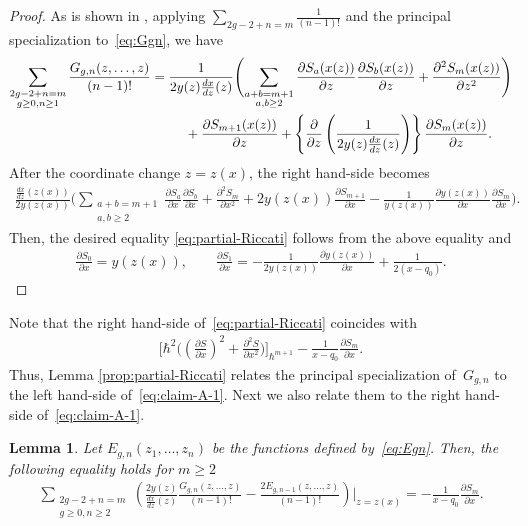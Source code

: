 \documentclass[pdftex]{sigma}
\newtheorem{lem}[thm]{Lemma}
\theoremstyle{definition}
\numberwithin{equation}{section}
\def\p{\partial}
\begin{document}
\begin{proof}
As is shown in \cite[Theorem 6.5]{DM14},
applying $\sum\limits_{2g-2+n=m} \frac{1}{(n-1)!}$
and the principal specia\-li\-zation to~\eqref{eq:Ggn}, we have
\begin{gather*}
\sum_{\substack{2g-2+n=m \\ g\ge0, n\ge 1}}
\frac{G_{g,n}(z,\dots,z)}{(n-1)!} = \frac{1}{2y(z)\frac{dx}{dz}(z)}
\Biggl( \sum_{\substack{a+b=m+1 \\ a,b \ge 2}}
\frac{\p S_{a}(x(z))}{\p z} \frac{\p S_{b}(x(z))}{\p z} +
\frac{\p^{2}S_{m}(x(z))}{\p z^{2}} \Biggr)
\\
\hphantom{\sum_{\substack{2g-2+n=m \\ g\ge0, n\ge 1}}
\frac{G_{g,n}(z,\dots,z)}{(n-1)!} =}{}
+ \frac{\p S_{m+1}(x(z))}{\p z}
+ \left\{ \frac{\p }{\p z}\left(
\frac{1}{2 y(z) \frac{dx}{dz}(z)} \right) \right\}
\frac{\p S_{m}(x(z))}{\p z}.
\end{gather*}
After the coordinate change $z = z(x)$, the right hand-side becomes
\begin{gather*}
\frac{\frac{dx}{dz}(z(x))}{2y(z(x))}\Biggl(
\sum_{\substack{a+b=m+1 \\ a,b \ge 2}}
\frac{\p S_{a}}{\p x} \frac{\p S_{b}}{\p x} +
\frac{\p^{2}S_{m}}{\p x^{2}} + 2y(z(x)) \frac{\p S_{m+1}}{\p x}
- \frac{1}{y(z(x))}\frac{\p y(z(x))}{\p x} \frac{\p S_{m}}{\p x} \Biggr).
\end{gather*}
Then, the desired equality \eqref{eq:partial-Riccati} follows
from the above equality and
\begin{gather*}
\frac{\p S_{0}}{\p x} = y(z(x)), \qquad
\frac{\p S_{1}}{\p x} =
-\frac{1}{2 y(z(x))} \frac{\p y(z(x))}{\p x} + \frac{1}{2(x-q_{0})}.\tag*{\qed}
\end{gather*}
\renewcommand{\qed}{}
\end{proof}

Note that the right hand-side of~\eqref{eq:partial-Riccati} coincides with
\begin{gather*}
\biggl[ \hbar^{2}\biggl( \left(\frac{\p S}{\p x}\right)^{2} +
\frac{\p^{2} S}{\p x^{2}} \biggr)  \biggr]_{\hbar^{m+1}}
- \frac{1}{x-q_{0}} \frac{\p S_{m}}{\p x}.
\end{gather*}
Thus, Lemma \ref{prop:partial-Riccati} relates
the principal specialization of~$G_{g,n}$
to the left hand-side of~\eqref{eq:claim-A-1}.
Next we also relate them to the right hand-side of~\eqref{eq:claim-A-1}.

\begin{lem} \label{lemma:sum-prin-G-and-E}
Let $E_{g,n}(z_{1},\dots,z_{n})$
be the functions defined by~\eqref{eq:Egn}.
Then, the following equality holds for $m \ge 2$
\begin{gather} \label{eq:sum-prin-G-and-E}
\sum_{\substack{2g-2+n=m \\ g \ge 0, n\ge 2 }}
\left(
\frac{2y(z)}{\frac{dx}{dz}(z)}
\frac{G_{g,n}(z,\dots,z)}{(n-1)!} -
\frac{2 E_{g,n-1}(z,\dots,z)}{(n-1)!}\right)\Biggr|_{z=z(x)}
 = -\frac{1}{x-q_{0}} \frac{\p S_{m}}{\p x}.
\end{gather}
\end{lem}
\end{document}
